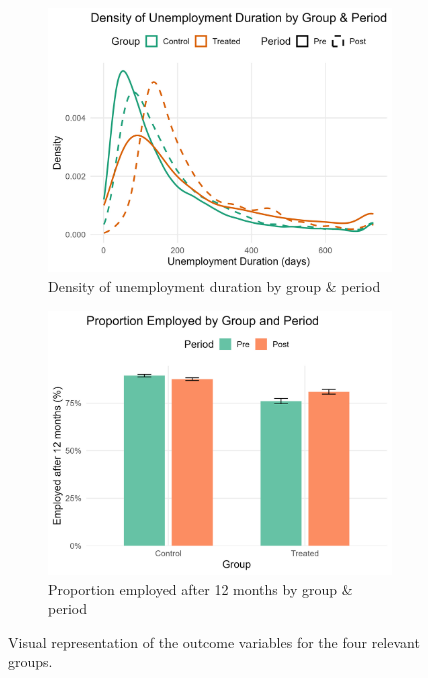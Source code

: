 \documentclass{scrartcl}
\begin{document}
\begin{figure}[h!]
  \centering
  \begin{subfigure}[t]{0.48\textwidth}
    \centering
    \includegraphics[width=\linewidth]{output/figures/final_unemployment_duration_density.jpg}
    \caption{Density of unemployment duration by group \& period}
    \label{fig:density}
  \end{subfigure}
  \hfill
  \begin{subfigure}[t]{0.48\textwidth}
    \centering
    \includegraphics[width=\linewidth]{output/figures/final_employment12m.jpg}
    \caption{Proportion employed after 12 months by group \& period}
    \label{fig:employment}
  \end{subfigure}
  \caption{Visual representation of the outcome variables for the four relevant groups.}
  \label{fig:combined}
\end{figure}
\end{document}
